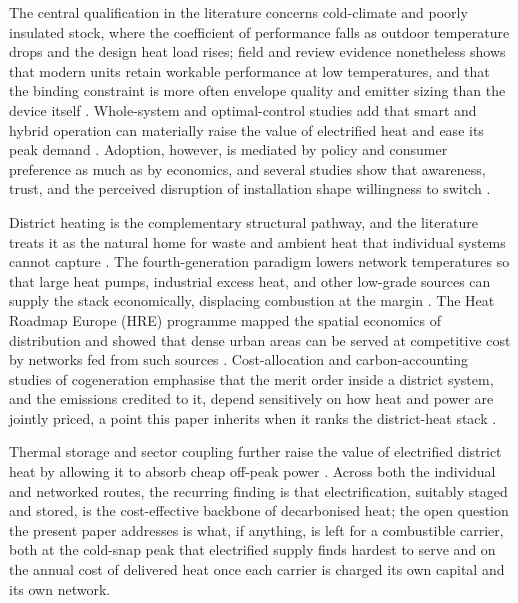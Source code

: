 The central qualification in the literature concerns cold-climate and poorly insulated
stock, where the coefficient of performance falls as outdoor temperature drops and the
design heat load rises; field and review evidence nonetheless shows that modern units
retain workable performance at low temperatures, and that the binding constraint is more
often envelope quality and emitter sizing than the device itself
\citep{Gibb2023Coming,Lingard2020Residential}. Whole-system and optimal-control studies
add that smart and hybrid operation can materially raise the value of electrified heat
and ease its peak demand \citep{Hoseinpoori2022,Vivian2019Algorithm}. Adoption, however,
is mediated by policy and consumer preference as much as by economics, and several
studies show that awareness, trust, and the perceived disruption of installation shape
willingness to switch \citep{Kokoni2021Policy,Corbett2023Pumping}.

District heating is the complementary structural pathway, and the literature treats it
as the natural home for waste and ambient heat that individual systems cannot capture
\citep{Mathiesen2019Towards,Lund2018Status}. The fourth-generation paradigm lowers
network temperatures so that large heat pumps, industrial excess heat, and other
low-grade sources can supply the stack economically, displacing combustion at the margin
\citep{Lund2018Status,Mller2019Heat}. The Heat Roadmap Europe (HRE) programme mapped the
spatial economics of distribution and showed that dense urban areas can be served at
competitive cost by networks fed from such sources
\citep{Persson2019Heat,Mller2019Heat}. Cost-allocation and carbon-accounting studies of
cogeneration emphasise that the merit order inside a district system, and the emissions
credited to it, depend sensitively on how heat and power are jointly priced, a point
this paper inherits when it ranks the district-heat stack
\citep{Doroti2021Evaluation,Javanshir2022Abandoning}.

Thermal storage and sector coupling further raise the value of electrified district heat
by allowing it to absorb cheap off-peak power
\citep{Enescu2020Thermal,Vecchi2022Carnot}. Across both the individual and networked
routes, the recurring finding is that electrification, suitably staged and stored, is
the cost-effective backbone of decarbonised heat; the open question the present paper
addresses is what, if anything, is left for a combustible carrier, both at the cold-snap
peak that electrified supply finds hardest to serve and on the annual cost of delivered
heat once each carrier is charged its own capital and its own network.

